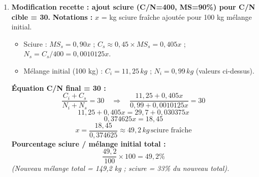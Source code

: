 \documentclass[11pt]{article}
\begin{document}
\begin{corrige}
\begin{enumerate}
\begin{enumerate}
        \item \textbf{Modification recette : ajout sciure (C/N=400, MS=90\%) pour C/N cible = 30.}
        \textbf{Notations :} $x$ = kg sciure fraîche ajoutée pour 100 kg mélange initial.
        \begin{itemize}
            \item Sciure : $MS_s = 0,90x$ ; $C_s \approx 0,45 \times MS_s = 0,405x$ ; $N_s = C_s / 400 = 0,0010125x$.
            \item Mélange initial (100 kg) : $C_i = 11,25\,kg$ ; $N_i = 0,99\,kg$ (valeurs ci-dessus).
        \end{itemize}
        \textbf{Équation C/N final = 30 :}
        \[ \frac{C_i + C_s}{N_i + N_s} = 30 \quad \Rightarrow \quad \frac{11,25 + 0,405x}{0,99 + 0,0010125x} = 30 \]
        \[ 11,25 + 0,405x = 29,7 + 0,030375x \]
        \[ 0,374625x = 18,45 \]
        \[ x = \frac{18,45}{0,374625} \approx \boxed{49,2\,kg\,\text{sciure fraîche}} \]
        \textbf{Pourcentage sciure / mélange initial total :}
        \[ \frac{49,2}{100} \times 100 = \boxed{49,2\%} \]
        \textit{(Nouveau mélange total = 149,2 kg ; sciure = 33\% du nouveau total).}
    \end{enumerate}


\end{enumerate}
\end{corrige}
\end{document}
